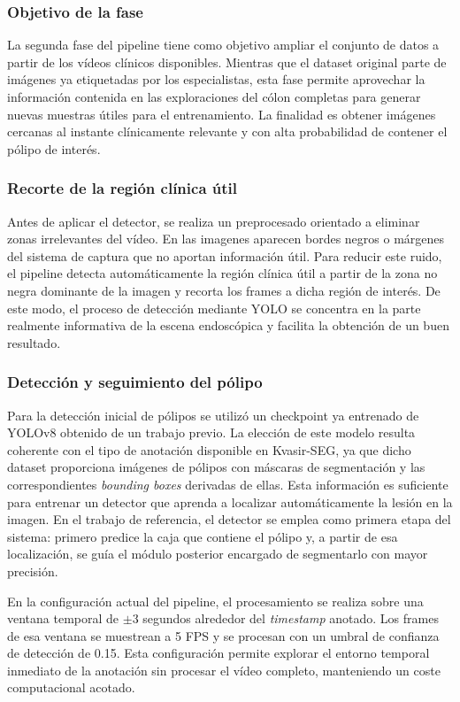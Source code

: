 ﻿\documentclass[10pt,a4paper,twocolumn,twoside]{article}
\begin{document}
\subsubsection{Objetivo de la fase}
La segunda fase del pipeline tiene como objetivo ampliar el conjunto de datos a partir de los vídeos clínicos disponibles. Mientras que el dataset original parte de imágenes ya etiquetadas por los especialistas, esta fase permite aprovechar la información contenida en las exploraciones del cólon completas para generar nuevas muestras útiles para el entrenamiento. La finalidad es obtener imágenes cercanas al instante clínicamente relevante y con alta probabilidad de contener el pólipo de interés.

\subsubsection{Recorte de la región clínica útil}
Antes de aplicar el detector, se realiza un preprocesado orientado a eliminar zonas irrelevantes del vídeo. En las imagenes aparecen bordes negros o márgenes del sistema de captura que no aportan información útil. Para reducir este ruido, el pipeline detecta automáticamente la región clínica útil a partir de la zona no negra dominante de la imagen y recorta los frames a dicha región de interés. De este modo, el proceso de detección mediante YOLO se concentra en la parte realmente informativa de la escena endoscópica y facilita la obtención de un buen resultado.

\subsubsection{Detección y seguimiento del pólipo}
Para la detección inicial de pólipos se utilizó un checkpoint ya entrenado de YOLOv8 obtenido de un trabajo previo. La elección de este modelo resulta coherente con el tipo de anotación disponible en Kvasir-SEG, ya que dicho dataset proporciona imágenes de pólipos con máscaras de segmentación y las correspondientes \textit{bounding boxes} derivadas de ellas. Esta información es suficiente para entrenar un detector que aprenda a localizar automáticamente la lesión en la imagen. En el trabajo de referencia, el detector se emplea como primera etapa del sistema: primero predice la caja que contiene el pólipo y, a partir de esa localización, se guía el módulo posterior encargado de segmentarlo con mayor precisión.\cite{kvasirseg2019,sajjad_yolo_sam2}

En la configuración actual del pipeline, el procesamiento se realiza sobre una ventana temporal de $\pm 3$ segundos alrededor del \textit{timestamp} anotado. Los frames de esa ventana se muestrean a 5 FPS y se procesan con un umbral de confianza de detección de 0.15. Esta configuración permite explorar el entorno temporal inmediato de la anotación sin procesar el vídeo completo, manteniendo un coste computacional acotado.
\end{document}
